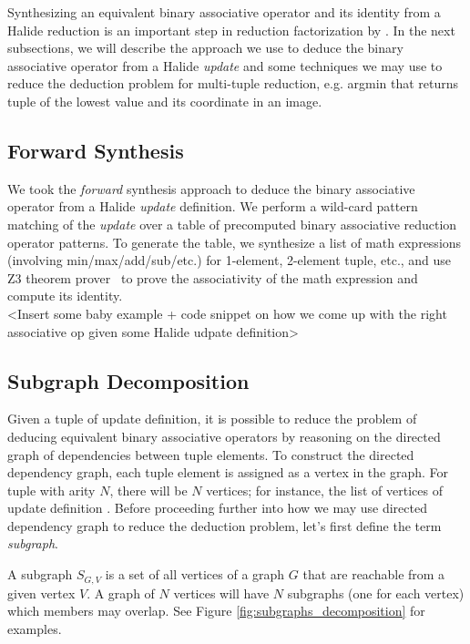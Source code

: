 Synthesizing an equivalent binary associative operator and its identity from a Halide reduction is an important step in reduction factorization by . In the next subsections, we will describe the approach we use to deduce the binary associative operator from a Halide \emph{update} and some techniques we may use to reduce the deduction problem for multi-tuple reduction, e.g. argmin that returns tuple of the lowest value and its coordinate in an image.

\subsection{Forward Synthesis}

We took the \emph{forward} synthesis approach to deduce the binary associative operator from a Halide \emph{update} definition. We perform a wild-card pattern matching of the \emph{update} over a table of precomputed binary associative reduction operator patterns. To generate the table, we synthesize a list of math expressions (involving min/max/add/sub/etc.) for 1-element, 2-element tuple, etc., and use Z3 theorem prover~\cite{DeMoura:2008:ZES:1792734.1792766} to prove the associativity of the math expression and compute its identity. \\

<Insert some baby example + code snippet on how we come up with the right associative op given some Halide udpate definition> \\

\subsection{Subgraph Decomposition}

Given a tuple of update definition, it is possible to reduce the problem of deducing equivalent binary associative operators by reasoning on the directed graph of dependencies between tuple elements. To construct the directed dependency graph, each tuple element is assigned as a vertex in the graph. For tuple with arity $N$, there will be $N$ vertices; for instance, the list of vertices of update definition . Before proceeding further into how we may use directed dependency graph to reduce the deduction problem, let's first define the term \emph{subgraph}. 

\begin{definition}
A subgraph $S_{G,V}$ is a set of all vertices of a graph $G$ that are reachable from a given vertex $V$. A graph of $N$ vertices will have $N$ subgraphs (one for each vertex) which members may overlap. See Figure \ref{fig:subgraphs_decomposition} for examples. 
\end{definition}

